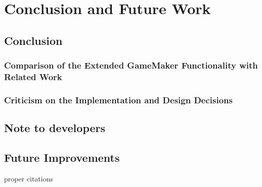\documentclass[bsc,frontabs,twoside,singlespacing,parskip,deptreport]{infthesis}     %
\begin{document}
\chapter{Conclusion and Future Work}
\section{Conclusion}
\subsection{Comparison of the Extended GameMaker Functionality with Related Work}
\subsection{Criticism on the Implementation and Design Decisions}
\section{Note to developers}

\section{Future Improvements}






proper citations\\
\cite{Multiplayer_Networking_modern_engine} %
\cite{Fairness_and_Playability}
\cite{Pro_HTML5_Programming} %
\cite{HTML5_Up_and_Running}
\cite{Friendly_Programming} %
\cite{Mark_Overmars}
\cite{Death_Flash_Java}
\cite{Why_Nodejs}
\cite{Node_Stress_Test}
\cite{NodeJS_Image}
\cite{Socketio_Benchmark}
\cite{Socketio_TCP_Benchmark}
\cite{Socketio}
\cite{Canvas_API}
\cite{Web_Apps_Superior}
\cite{Community_Social_Psychology}
\cite{Why_MMOG} %
\cite{Browser_Games}
\cite{Browser_Networking}
\cite{Web_Apps_Superior}
\cite{P2P_Video_Streaming_HTML5_WebRTC}
\cite{Gamemaker_DnD}
\cite{GameMaker_Studio}
\cite{Optimizing_Multiplayer_3D_Game_Synch} %
\cite{Optimizing_WebSockets_Bandwidth} %
\cite{Google_Play_Store}
\cite{Apple_App_Store}
\cite{HTML5_Game_Dev_Gamemaker} %
\cite{SE_7_Principles}
\cite{Software_Engineering}
\cite{Construct2_Multiplayer_Tutorial}
\cite{WebSocket}
\cite{NAT}
\cite{Where_WebRTC}
\end{document}
